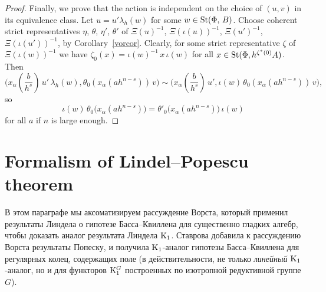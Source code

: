 \documentclass[oneside, 11pt]{amsart} \pdfoutput=1
\begin{document}
\begin{proof}
Finally, we prove that the action is independent on the choice of $(u, v)$ in its equivalence class. Let $u = u' \lambda_h(w)$ for some $w \in \mathop{\mathrm{St}}\nolimits(\Phi,\,B)$. Choose coherent strict representatives $\eta$, $\theta$, $\eta'$, $\theta'$ of $\Xi(u)^{-1}$, $\Xi(\iota(u))^{-1}$, $\Xi(u')^{-1}$, $\Xi(\iota(u'))^{-1}$, by Corollary~\ref{vorcor}. Clearly, for some strict representative $\zeta$ of $\Xi(\iota(w))^{-1}$ we have $\zeta_0(x) = \iota(w)^{-1}\, x\, \iota(w)$ for all $x \in \mathop{\mathrm{St}}\nolimits(\Phi, h^{\zeta^*(0)} A)$.
Then
$$\textstyle
\bigl(x_\alpha(\frac b {h^s})\, u'\, \lambda_h(w), \theta_0(x_\alpha(ah^{n - s}))\, v\bigr) \sim \bigl(x_\alpha(\frac b {h^s})\, u', \iota(w)\, \theta_0(x_\alpha(ah^{n - s}))\, v\bigr),
$$
so
$$
\iota(w)\, \theta_0\bigl(x_\alpha(ah^{n-s})\bigr) = \theta'_0\bigl(x_\alpha(ah^{n-s})\bigr)\, \iota(w)
$$
for all \(a\) if \(n\) is large enough.
\end{proof}



\section{Formalism of Lindel--Popescu theorem}
В этом параграфе мы аксоматизируем рассуждение Ворста, который применил результаты Линдела о гипотезе Басса--Квиллена для существенно гладких алгебр, чтобы доказать аналог результата Линдела ${\mathrm{K}}_1$. Ставрова добавила к рассуждению Ворста результаты Попеску, и получила ${\mathrm{K}}_1$-аналог гипотезы Басса--Квиллена для регулярных колец, содержащих поле (в действительности, не только {\it линейный} ${\mathrm{K}}_1$-аналог, но и для функторов ${\mathrm{K}}_1^G$ построенных по изотропной редуктивной группе $G$).
\end{document}
